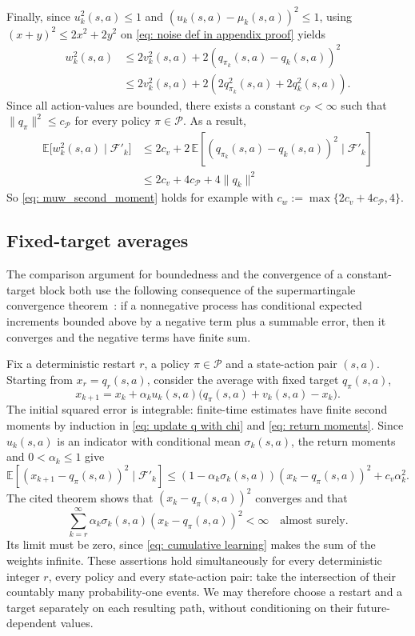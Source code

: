 \documentclass[twoside,11pt]{article}
\newcommand{\polset}{\mathcal{P}}
\DeclareRobustCommand{\reviewbarstart}{%
  \ifhmode %
    \vadjust{\vbox to 0pt{%
      \vskip-\ht\strutbox %
      \vskip-\dp\strutbox %
      \cbstart[\changebarwidth] %
      \vss %
    }}%
  \else %
    \cbstart[\changebarwidth]%
  \fi %
} %
\providecommand{\DIFadd}[1]{#1} %
\providecommand{\DIFaddbegin}{\reviewbarstart} %
\providecommand{\DIFaddend}{\protect\cbend} %
\def\DIFadd#1{#1}%
\def\DIFaddbegin{}%
\def\DIFaddend{}%
\begin{document}
Finally, since $u_k^2(s,a) \le 1$ and $(u_k(s,a) - \mu_k(s,a))^2 \le 1$,
using $(x+y)^2 \le 2 x^2 + 2 y^2$ on \eqref{eq: noise def in appendix proof} yields
\begin{align*}
w_k^2(s,a)
&\le 2 v_k^2(s,a) + 2 (q_{\pi_k}(s,a)-q_k(s,a) )^2
\\
&\le 2 v_k^2(s,a) + 2 ( 2 q_{\pi_k}^2(s,a) + 2 q_k^2(s,a) ) .
\end{align*}
Since all action-values are bounded,
there exists a constant $c_\polset < \infty$ such that $\|q_\pi\|^2 \leq c_\polset$ for every policy $\pi \in \polset$. As a result,
 \DIFaddbegin \begin{align*}
\DIFadd{\mathbb E \!\big[ w_{k}^2(s,a) \mid \mathcal F'_k \big]
}&\DIFadd{\le
2 c_v + 2 \, \mathbb E \!\left[ ( q_{\pi_k}(s,a)-q_k(s,a) )^2 \mid \mathcal F'_k \right]
}\\
&\DIFadd{\le
2 c_v + 4 c_\polset + 4 \|q_k\|^2
}\end{align*}\DIFaddend 
So \eqref{eq: muw_second_moment} holds for example with $c_w := \max \{ 2 c_v + 4 c_\polset, 4\}$.
\hfill \BlackBox

 \DIFaddbegin \subsection{\DIFadd{Fixed-target averages}}
\label{app: fixed target averages}
\DIFadd{The comparison argument for boundedness and the convergence of a constant-target block both use the following consequence of the supermartingale convergence theorem~\citep[Proposition~4.2]{Bertsekas1996Neuro-DynamicProgramming}: if a nonnegative process has conditional expected increments bounded above by a negative term plus a summable error, then it converges and the negative terms have finite sum.
}\DIFaddend 

 \DIFaddbegin \DIFadd{Fix a deterministic restart $r$, a policy $\pi\in\mathcal P$ and a state-action pair $(s,a)$.
Starting from $x_r=q_r(s,a)$, consider the average with fixed target $q_\pi(s,a)$,
}\[
\DIFadd{x_{k+1}=x_k+\alpha_k u_k(s,a)\big(q_\pi(s,a)+v_k(s,a)-x_k\big).
}\]
\DIFadd{The initial squared error is integrable: finite-time estimates have finite second moments by induction in \eqref{eq: update q with chi} and \eqref{eq: return moments}.
Since $u_k(s,a)$ is an indicator with conditional mean $\sigma_k(s,a)$, the return moments and $0<\alpha_k\le1$ give
}\[
\DIFadd{\mathbb E\!\left[(x_{k+1}-q_\pi(s,a))^2\mid\mathcal F'_k\right]
\le (1-\alpha_k\sigma_k(s,a))(x_k-q_\pi(s,a))^2+c_v\alpha_k^2.
}\]
\DIFadd{The cited theorem shows that $(x_k-q_\pi(s,a))^2$ converges and that
}\[
\DIFadd{\sum_{k=r}^{\infty}\alpha_k\sigma_k(s,a)(x_k-q_\pi(s,a))^2<\infty
\quad\text{almost surely}.
}\]
\DIFadd{Its limit must be zero, since \eqref{eq: cumulative learning} makes the sum of the weights infinite.
These assertions hold simultaneously for every deterministic integer $r$, every policy and every state-action pair: take the intersection of their countably many probability-one events. We may therefore choose a restart and a target separately on each resulting path, without conditioning on their future-dependent values.
}\DIFaddend 
\end{document}
